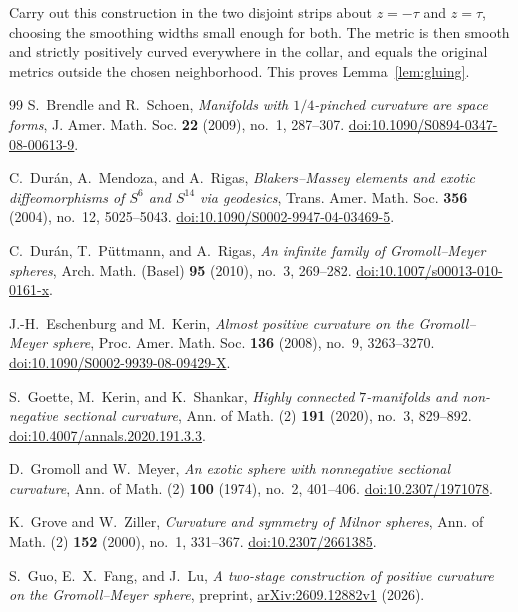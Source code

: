 \documentclass[12pt]{amsart}
\numberwithin{equation}{section}
\theoremstyle{remark}
\begin{document}
Carry out this construction in the two disjoint strips about
\(z=-\tau\) and \(z=\tau\), choosing the smoothing widths
small enough for both. The metric is then smooth and strictly
positively curved everywhere in the collar, and equals the
original metrics outside the chosen neighborhood. This proves Lemma~\ref{lem:gluing}.

\begin{thebibliography}{99}
S.~Brendle and R.~Schoen,
\emph{Manifolds with \(1/4\)-pinched curvature are space forms},
J. Amer. Math. Soc. \textbf{22} (2009), no.~1, 287--307.
\href{https://doi.org/10.1090/S0894-0347-08-00613-9}{doi:10.1090/S0894-0347-08-00613-9}.

C.~Dur\'an, A.~Mendoza, and A.~Rigas,
\emph{Blakers--Massey elements and exotic diffeomorphisms of
\(S^6\) and \(S^{14}\) via geodesics},
Trans. Amer. Math. Soc. \textbf{356} (2004), no.~12, 5025--5043.
\href{https://doi.org/10.1090/S0002-9947-04-03469-5}{doi:10.1090/S0002-9947-04-03469-5}.

C.~Dur\'an, T.~P\"uttmann, and A.~Rigas,
\emph{An infinite family of Gromoll--Meyer spheres},
Arch. Math. (Basel) \textbf{95} (2010), no.~3, 269--282.
\href{https://doi.org/10.1007/s00013-010-0161-x}{doi:10.1007/s00013-010-0161-x}.

J.-H.~Eschenburg and M.~Kerin,
\emph{Almost positive curvature on the Gromoll--Meyer sphere},
Proc. Amer. Math. Soc. \textbf{136} (2008), no.~9, 3263--3270.
\href{https://doi.org/10.1090/S0002-9939-08-09429-X}{doi:10.1090/S0002-9939-08-09429-X}.

S.~Goette, M.~Kerin, and K.~Shankar,
\emph{Highly connected \(7\)-manifolds and non-negative sectional curvature},
Ann. of Math. (2) \textbf{191} (2020), no.~3, 829--892.
\href{https://doi.org/10.4007/annals.2020.191.3.3}{doi:10.4007/annals.2020.191.3.3}.

D.~Gromoll and W.~Meyer,
\emph{An exotic sphere with nonnegative sectional curvature},
Ann. of Math. (2) \textbf{100} (1974), no.~2, 401--406.
\href{https://doi.org/10.2307/1971078}{doi:10.2307/1971078}.

K.~Grove and W.~Ziller,
\emph{Curvature and symmetry of Milnor spheres},
Ann. of Math. (2) \textbf{152} (2000), no.~1, 331--367.
\href{https://doi.org/10.2307/2661385}{doi:10.2307/2661385}.

S.~Guo, E.~X.~Fang, and J.~Lu,
\emph{A two-stage construction of positive curvature on the Gromoll--Meyer sphere},
preprint, \href{https://arxiv.org/abs/2609.12882v1}{arXiv:2609.12882v1}
(2026).


\end{thebibliography}
\end{document}
